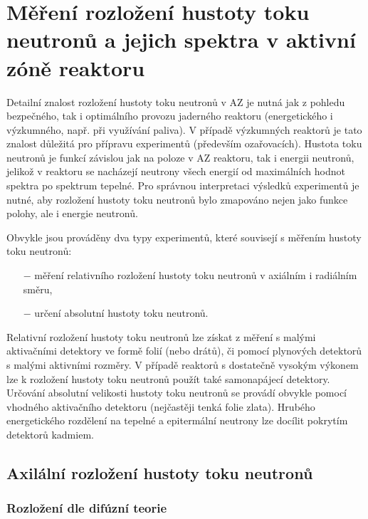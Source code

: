 \section[Měření rozložení hustoty toku]{Měření rozložení hustoty toku neutronů a jejich spektra v aktivní zóně reaktoru}

Detailní znalost rozložení hustoty toku neutronů v AZ je nutná jak z pohledu bezpečného, tak i optimálního provozu jaderného reaktoru (energetického i výzkumného, např. při využívání paliva). V případě výzkumných reaktorů je tato znalost důležitá pro přípravu experimentů (především ozařovacích). Hustota toku neutronů je funkcí závislou jak na poloze v AZ reaktoru, tak i energii neutronů, jelikož v reaktoru se nacházejí neutrony všech energií od maximálních hodnot spektra po spektrum tepelné. Pro správnou interpretaci výsledků experimentů je nutné, aby rozložení hustoty toku neutronů bylo zmapováno nejen jako funkce polohy, ale i energie neutronů.

Obvykle jsou prováděny dva typy experimentů, které souvisejí s měřením hustoty toku neutronů:

\begin{itemize}%
    \item[$-$] měření relativního rozložení hustoty toku neutronů v axiálním i radiálním směru,
    \item[$-$] určení absolutní hustoty toku neutronů.
\end{itemize}

Relativní rozložení hustoty toku neutronů lze získat z měření s malými aktivačními detektory ve formě folií (nebo drátů), či pomocí plynových detektorů s malými aktivními rozměry. V případě reaktorů s dostatečně vysokým výkonem lze k rozložení hustoty toku neutronů použít také samonapájecí detektory. Určování absolutní velikosti hustoty toku neutronů se provádí obvykle pomocí vhodného aktivačního detektoru (nejčastěji tenká folie zlata). Hrubého energetického rozdělení na tepelné a epitermální neutrony lze docílit pokrytím detektorů kadmiem.

\subsection{Axilální rozložení hustoty toku neutronů}

\subsubsection{Rozložení dle difúzní teorie}

